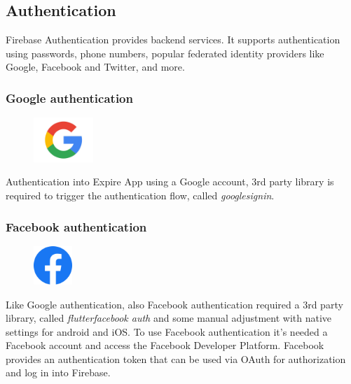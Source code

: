 \subsection{Authentication}
Firebase Authentication provides backend services. It supports authentication using passwords, phone numbers, popular federated identity providers like Google, Facebook and Twitter, and more.

\subsubsection{Google authentication}
\begin{figure}
\vspace{-0.8cm}
\includegraphics[width=0.20\textwidth]{Images/external_serv/g.png}
\end{figure}
Authentication into Expire App using a Google account, 3rd party library is required to trigger the authentication flow, called \textit{google\textunderscore sign\textunderscore in}.
\newpage

\subsubsection{Facebook authentication}
\begin{figure}
\vspace*{-0.8cm}
\includegraphics[width=0.13\textwidth]{Images/external_serv/f.png}
\end{figure}
Like Google authentication, also Facebook authentication required a 3rd party library, called \textit{flutter\textunderscore facebook \textunderscore auth} and some manual adjustment with native settings for android and iOS. To use Facebook authentication it's needed a Facebook account and access the Facebook Developer Platform. Facebook provides an authentication token that can be used via OAuth for authorization and log in into Firebase.\newline

